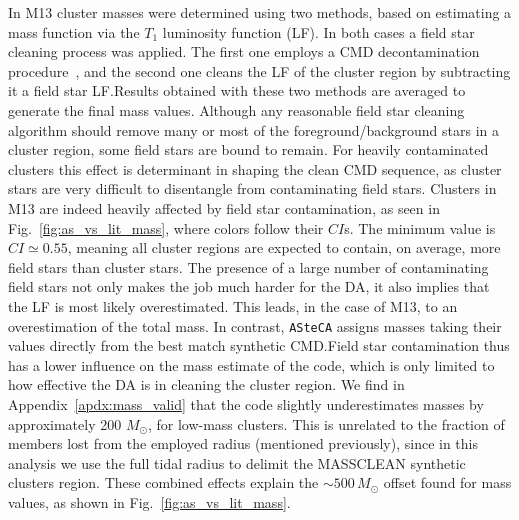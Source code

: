 \documentclass{aa}
\begin{document}
In M13 cluster masses were determined using two methods, based on estimating
a mass function via the $T_1$ luminosity function (LF).
In both cases a field star cleaning process was applied. The first one employs
a CMD decontamination procedure~\citep{Maia_2010}, and the
second one cleans the LF of the cluster region by subtracting it a field star
LF.\@ Results obtained with these two methods are averaged to generate the final
mass values.
%
Although any reasonable field star cleaning algorithm should remove many or most
of the foreground/background stars in a cluster region, some field stars are
bound to remain. For heavily contaminated clusters this effect is
determinant in shaping the clean CMD sequence, as cluster stars are
very difficult to disentangle from contaminating field stars.
%
Clusters in M13 are indeed heavily affected by field star contamination,
as seen in Fig.~\ref{fig:as_vs_lit_mass}, where colors follow their $CI$s.
The minimum value is $CI{\simeq}0.55$, meaning all cluster regions are expected
to contain, on average, more field stars than cluster stars.
%
The presence of a large number of contaminating field stars not only makes the
job much harder for the DA, it also implies that the LF is most likely
overestimated. This leads, in the case of M13, to an overestimation of the total
mass.
%
In contrast, \texttt{ASteCA} assigns masses taking their values directly from
the best match synthetic CMD.\@ Field star contamination thus has a lower
influence on the mass estimate of the code, which is only limited to how
effective the DA is in cleaning the cluster region.
%
We find in Appendix~\ref{apdx:mass_valid} that the code slightly
underestimates masses by approximately 200 $M_{\odot}$, for low-mass
clusters. This is unrelated to the fraction of members lost from the employed
radius (mentioned previously), since  in this analysis
we use the full tidal radius to delimit the MASSCLEAN synthetic clusters region.
These combined effects explain the ${\sim}500\,M_{\odot}$ offset found
for mass values, as shown in Fig.~\ref{fig:as_vs_lit_mass}.
\end{document}
